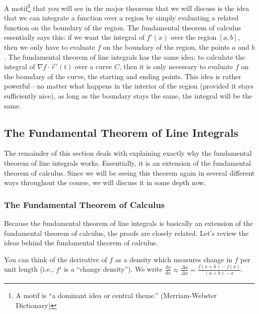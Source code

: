 A motif\footnote{A motif is ``a dominant idea or central theme.''
  (Merriam-Webster Dictionary)} that
you will see in the major theorems that we will discuss is the idea
that we can integrate a function over a region by simply evaluating
a related function on the boundary of the region.  The fundamental
theorem of calculus essentially says this: if we want the integral of
$f'(x)$ over the region $[a,b]$, then we only have to evaluate $f$ on
the boundary of the region, the points $a$ and $b$.  The fundamental
theorem of line integrals has the same idea: to calculate the integral
of $\nabla f\cdot \vec r'(t)$ over a curve $C$, then it is only necessary to
evaluate $f$ on the boundary of the curve, the starting and ending
points.  This idea is rather powerful---no matter what happens in the
interior of the region (provided it stays sufficiently
nice), as long as the boundary stays the same, the integral will be
the same.

\subsection{The Fundamental Theorem of Line Integrals}

The remainder of this section deals with explaining exactly why the
fundamental theorem of line integrals works. Essentially, it is an
extension of the fundamental theorem of calculus. Since we will be
seeing this theorem again in several different ways throughout the
course, we will discuss it in some depth now.

\subsubsection{The Fundamental Theorem of Calculus}

Because the fundamental theorem of line integrals is basically an
extension of the fundamental theorem of calculus, the proofs are
closely related.  Let's review the ideas behind the fundamental
theorem of calculus.

You can think of the derivative of $f$ as a density which measures
change in $f$ per unit length (i.e., $f'$ is a ``change density''). We
write $\frac{dy}{dx}\approx \frac{\Delta y}{\Delta x} = \frac{f(x+h)-f(x)}{(x+h)-x}$.

